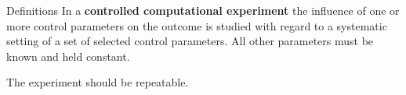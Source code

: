 \begin{frame}
\vspace*{2mm}
\begin{block}{
Definitions
}
In a {\bf controlled computational experiment} the influence
of one or more control parameters on the outcome is studied with
regard to a systematic setting of a set of selected control parameters.
All other parameters must be known and held constant.
 
The experiment should be repeatable.
\end{block}
\end{frame}